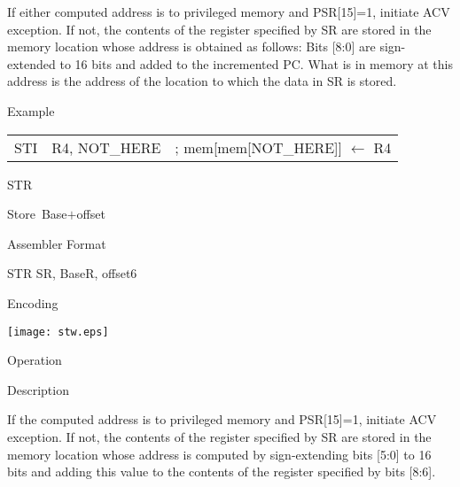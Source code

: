 \documentclass{patt}
\makeatletter
\renewcommand{\apphead}[2]{%
  \clearpage\vspace*{-8pt}
  \noindent\parbox[t]{21pc}{\raggedright\sans\fontsize{24}{28}\fontseries{bk}%
    \selectfont\MakeUppercase{#1}}\parbox[t]{7pc}{\sans\fontseries{bk}\fontsize{14}{28}\selectfont
    \raggedright #2}\@afterindentfalse\@afterheading\vspace*{-1pc}}
\renewcommand{\appbhead}[1]{%
  \goodbreak\vspace{6pt}
  \begingroup
  \noindent\raggedright{\sans\fontsize{12}{14}\fontseries{bk}\selectfont
  #1\par}\endgroup\medskip\@afterindentfalse\@afterheading}
\makeatother
\begin{document}
If either computed address is to privileged memory and PSR[15]=1, initiate ACV exception.
If not, the contents of the register specified by SR are stored in the
memory location whose address is obtained as follows: Bits [8:0] are
sign-extended to 16 bits and added to the incremented PC.
What is in memory at this address is the address of the
location to which the data in SR is stored.

\vspace{4pt}

\appbhead{Example}

\begin{tabular}{@{\quad\enskip\enskip}l@{\quad}l@{\qquad}l@{}}
STI & R4, NOT\_HERE & ; mem[mem[NOT\_HERE]] $\leftarrow$ R4
\end{tabular}

\apphead{Str}{\vspace{-18pt}\hspace{-2.7pc}\hbox{Store~Base$+$offset}}

 \vspace{14pt}

\appbhead{Assembler Format}

\begin{appverbatim}
STR   SR, BaseR, offset6
\end{appverbatim}

 \vspace{4pt}

\appbhead{Encoding}

\texttt{[image: stw.eps]}

\vspace{4pt}

\appbhead{Operation}
{}

\vspace{4pt}

\appbhead{Description}

If the computed address is to privileged memory and PSR[15]=1, initiate ACV exception.
If not, the contents of the register specified by SR are stored in the
memory location whose address is computed by sign-extending bits [5:0] to
16 bits and adding this value to the contents of the register specified by
bits [8:6].
\end{document}
